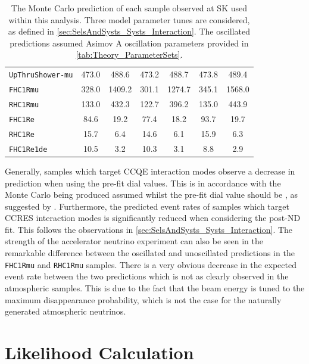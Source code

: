 \begin{table}[ht!]
\begin{tabular}{|l|c|c|c|c|c|c|}
      \texttt{UpThruShower-mu} & 473.0 & 488.6 & 473.2 & 488.7 & 473.8 & 489.4 \\
      \texttt{FHC1Rmu} & 328.0 & 1409.2 & 301.1 & 1274.7 & 345.1 & 1568.0 \\
      \texttt{RHC1Rmu} & 133.0 & 432.3 & 122.7 & 396.2 & 135.0 & 443.9 \\
      \texttt{FHC1Re} & 84.6 & 19.2 & 77.4 & 18.2 & 93.7 & 19.7 \\
      \texttt{RHC1Re} & 15.7 & 6.4 & 14.6 & 6.1 & 15.9 & 6.3 \\
      \texttt{FHC1Re1de} & 10.5 & 3.2 & 10.3 & 3.1 & 8.8 & 2.9 \\
      \hline
      \hline
    \end{tabular}
    \caption{The Monte Carlo prediction of each sample observed at SK used within this analysis. Three model parameter tunes are considered, as defined in \autoref{sec:SelsAndSysts_Systs_Interaction}. The oscillated predictions assumed Asimov A oscillation parameters provided in \autoref{tab:Theory_ParameterSets}.}
    \label{tab:OscillationAnalysis_MCPred}
\end{table}

Generally, samples which target CCQE interaction modes observe a decrease in prediction when using the pre-fit dial values. This is in accordance with the Monte Carlo being produced assumed  whilst the pre-fit dial value should be , as suggested by \cite{t2k_tn_344}. Furthermore, the predicted event rates of samples which target CCRES interaction modes is significantly reduced when considering the post-ND fit. This follows the observations in \autoref{sec:SelsAndSysts_Systs_Interaction}. The strength of the accelerator neutrino experiment can also be seen in the remarkable difference between the oscillated and unoscillated predictions in the \texttt{FHC1Rmu} and \texttt{RHC1Rmu} samples. There is a very obvious decrease in the expected event rate between the two predictions which is not as clearly observed in the atmospheric samples. This is due to the fact that the beam energy is tuned to the maximum disappearance probability, which is not the case for the naturally generated atmospheric neutrinos.

\section{Likelihood Calculation}
\label{sec:OscillationAnalysis_LLHCalc}

